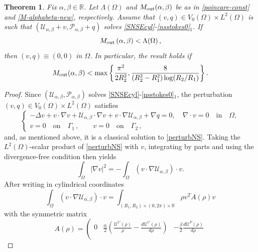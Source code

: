 \documentclass[a4paper,11pt]{amsart}
\newtheorem{theorem}{Theorem}[section]
\numberwithin{equation}{section}
\numberwithin{figure}{section}
\def\U{{\mathcal U}}
\def\P{{\mathcal P}}
\begin{document}
	\begin{theorem}\label{uniqueness}
		Fix $\alpha,\beta \in \mathbb{R}$.  Let  $\Lambda(\Omega)$ and $M_{\rm out}(\alpha, \beta)$  be as in \eqref{poincare-const} and
		\eqref{M-alphabeta-new}, respectively. Assume that $(v, q)\in V_0(\Omega)\times L^2(\Omega)$ is such that $(\U_{\alpha,\beta} + v , \P_{\alpha,\beta} + q)$  solves \eqref{SNSEcyl}-\eqref{nsstokes0}$_1$. If
		\begin{equation}\label{small-cond-theo}
			M_{\rm out}\left(\alpha, \beta \right) < \Lambda (\Omega)\,,
		\end{equation} then $(v,q)\equiv(0,0)$ in $\Omega$. In particular, the result holds if
$$M_{\rm out}(\alpha, \beta) < \max\left\{\frac{\pi^2}{2R_2^2},\frac{8}{(R_2^2 - R_1^2)\log (R_2/R_1)}\right\}.
$$
	\end{theorem}
	\begin{proof} Since $(\U_{\alpha,\beta}, \P_{\alpha, \beta})$ solves \eqref{SNSEcyl}-\eqref{nsstokes0}$_1$,
		the perturbation $(v,q)\in V_0(\Omega)\times L^2(\Omega)$ satisfies
		\begin{equation}\label{perturbNS}\begin{cases}
				-\Delta v + v \cdot \nabla v +\U_{\alpha,\beta} \cdot \nabla v  + v \cdot \nabla \U_{\alpha,\beta} + \nabla q =0, \quad \nabla\cdot v =0 \quad \text{in} \quad \Omega, \\[5pt]
				v = 0\quad \text{on}\quad \Gamma_1\, ,\qquad v =0\quad \text{on}\quad \Gamma_2\, ,
			\end{cases}
		\end{equation}and, as mentioned above, it is a classical solution to \eqref{perturbNS}.
		Taking the $L^2(\Omega)$-scalar product of \eqref{perturbNS} with $v$, integrating by parts and using the divergence-free condition then yields
		\begin{equation}\label{dirnorm-v}
			\int_\Omega |\nabla v|^2  = - \int_{\Omega}\left(v\cdot \nabla \U_{\alpha,\beta}\right) \cdot v.
		\end{equation}
		After writing in cylindrical coordinates
		\begin{equation}
			\int_\Omega (	v\cdot \nabla \U_{\alpha,\beta} )\cdot v = \int_{(R_1,R_2)\times (0,2\pi)\times \mathbb{R}}\rho v^TA(\rho)v
		\end{equation}
		with the symmetric matrix
		\begin{equation}\label{Arho}
			A(\rho)=\left( \begin{matrix}
				0& \frac{\alpha}{2}\left(\frac{\U^C(\rho)}{\rho}-\frac{d \U^C(\rho)}{d\rho}\right)&-\frac{\beta}{2}\frac{d \U^P(\rho)}{d \rho}\\[5pt]

\end{matrix}
\end{equation}
\end{proof}
\end{document}

